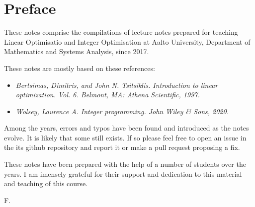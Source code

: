 \section*{Preface}

These notes comprise the compilations of lecture notes prepared for teaching Linear Optimisatio and Integer Optimisation at Aalto University, Department of Mathematics and Systems Analysis, since 2017.

These notes are mostly based on these references:

\begin{itemize}
    \item \textit{Bertsimas, Dimitris, and John N. Tsitsiklis. Introduction to linear optimization. Vol. 6. Belmont, MA: Athena Scientific, 1997.}
    \item \textit{Wolsey, Laurence A. Integer programming. John Wiley \& Sons, 2020.}
\end{itemize}

Among the years, errors and typos have been found and introduced as the notes evolve. It is likely that some still exists. If so please feel free to open an issue in the its github repository and report it or make a pull request proposing a fix.

These notes have been prepared with the help of a number of students over the years. I am imensely grateful for their support and dedication to this material and teaching of this course.

F.